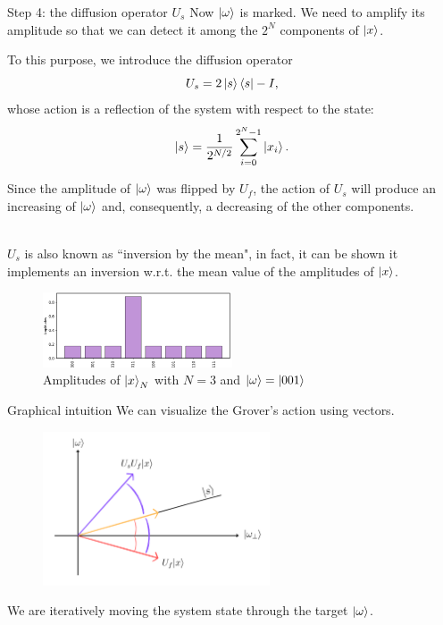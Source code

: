 \documentclass[aspectratio=169, 8pt, xcolor={svgnames}, hyperref={linkcolor=black}]{beamer}
\begin{document}
\begin{frame}{Step 4: the diffusion operator $U_s$}
Now $\ket{\omega}$ is marked. We need to amplify its amplitude so that we can 
detect it among the $2^N$ components of $\ket{x}$. \pause

To this purpose, we introduce the diffusion operator
$$ U_s =  2 \ket{s}\bra{s} - I, $$
whose action is a reflection of the system with respect to the state:
$$ \ket{s} = \frac{1}{2^{N/2}}\sum_{i=0}^{2^N - 1} \ket{x_i}. $$ \pause 

Since the amplitude of $\ket{\omega}$ was flipped by $U_f$, the action of $U_s$ 
will produce an increasing of $\ket{\omega}$ and, consequently, a decreasing of the 
other components. \pause

\begin{multicols}{2}
\textit{\\}
$U_s$ is also known as \textcolor{carnelian}{``inversion by the mean"}, in fact, it can be shown 
it implements an inversion w.r.t. the mean value of the amplitudes of $\ket{x}$.
\begin{figure}
   \includegraphics[width=0.5\textwidth]{figures/state3.png}
   \caption*{Amplitudes of $\ket{x}_N$ with $N=3$ and $\ket{\omega} = \ket{001}$}
\end{figure}
\end{multicols}
\end{frame}

\begin{frame}{Graphical intuition}
We can visualize the Grover's action using vectors.
\begin{figure}
   \includegraphics[width=0.6\textwidth]{figures/vectors.png}
\end{figure}
We are iteratively moving the system state through the target $\ket{\omega}$.
\end{frame}
\end{document}
